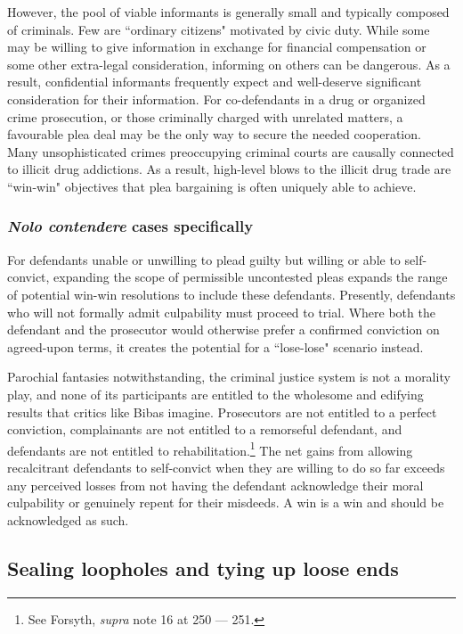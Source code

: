 However, the pool of viable informants is generally small and typically composed of criminals. Few are ``ordinary citizens" motivated by civic duty. While some may be willing to give information in exchange for financial compensation or some other extra-legal consideration, informing on others can be dangerous. As a result, confidential informants frequently expect and well-deserve significant consideration for their information. For co-defendants in a drug or organized crime prosecution, or those criminally charged with unrelated matters, a favourable plea deal may be the only way to secure the needed cooperation. Many unsophisticated crimes preoccupying criminal courts are causally connected to illicit drug addictions. As a result, high-level blows to the illicit drug trade are ``win-win" objectives that plea bargaining is often uniquely able to achieve. 

\subsubsection{\textit{Nolo contendere} cases specifically}

For defendants unable or unwilling to plead guilty but willing or able to self-convict, expanding the scope of permissible uncontested pleas expands the range of potential win-win resolutions to include these defendants. Presently, defendants who will not formally admit culpability must proceed to trial. Where both the defendant and the prosecutor would otherwise prefer a confirmed conviction on agreed-upon terms, it creates the potential for a ``lose-lose" scenario instead.

Parochial fantasies notwithstanding, the criminal justice system is not a morality play, and none of its participants are entitled to the wholesome and edifying results that critics like Bibas imagine. Prosecutors are not entitled to a perfect conviction, complainants are not entitled to a remorseful defendant, and defendants are not entitled to rehabilitation.\footnote{See Forsyth, \textit{supra} note 16 at 250 — 251.} The net gains from allowing recalcitrant defendants to self-convict when they are willing to do so far exceeds any perceived losses from not having the defendant acknowledge their moral culpability or genuinely repent for their misdeeds. A win is a win and should be acknowledged as such.

\subsection{Sealing loopholes and tying up loose ends}

